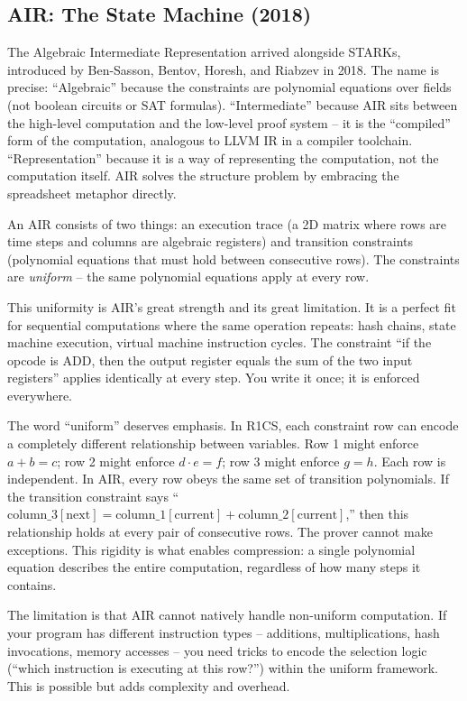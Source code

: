 \documentclass[
  11pt,
  openany]{report}
\begin{document}
\subsection{AIR: The State Machine (2018)}\label{air-the-state-machine-2018}

The Algebraic Intermediate Representation arrived alongside STARKs, introduced
by Ben-Sasson, Bentov, Horesh, and Riabzev in 2018. The name is precise:
``Algebraic'' because the constraints are polynomial equations over fields (not
boolean circuits or SAT formulas). ``Intermediate'' because AIR sits between the
high-level computation and the low-level proof system -- it is the ``compiled''
form of the computation, analogous to LLVM IR in a compiler toolchain.
``Representation'' because it is a way of representing the computation, not the
computation itself. AIR solves the structure problem by embracing the
spreadsheet metaphor directly.

An AIR consists of two things: an execution trace (a 2D matrix where rows are
time steps and columns are algebraic registers) and transition constraints
(polynomial equations that must hold between consecutive rows). The constraints
are \emph{uniform} -- the same polynomial equations apply at every row.

This uniformity is AIR's great strength and its great limitation. It is a
perfect fit for sequential computations where the same operation repeats: hash
chains, state machine execution, virtual machine instruction cycles. The
constraint ``if the opcode is ADD, then the output register equals the sum of
the two input registers'' applies identically at every step. You write it once;
it is enforced everywhere.

The word ``uniform'' deserves emphasis. In R1CS, each constraint row can encode
a completely different relationship between variables. Row 1 might enforce
\(a + b = c\); row 2 might enforce \(d \cdot e = f\); row 3 might enforce
\(g = h\). Each row is independent. In AIR, every row obeys the same set of
transition polynomials. If the transition constraint says
``\(\text{column\_3}[\text{next}] = \text{column\_1}[\text{current}] + \text{column\_2}[\text{current}]\),''
then this relationship holds at every pair of consecutive rows. The prover
cannot make exceptions. This rigidity is what enables compression: a single
polynomial equation describes the entire computation, regardless of how many
steps it contains.

The limitation is that AIR cannot natively handle non-uniform computation. If
your program has different instruction types -- additions, multiplications, hash
invocations, memory accesses -- you need tricks to encode the selection logic
(``which instruction is executing at this row?'') within the uniform framework.
This is possible but adds complexity and overhead.
\end{document}
